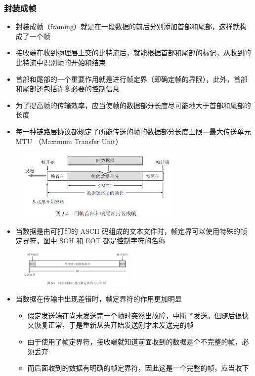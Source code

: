 \documentclass[cs4size,a4paper,10pt]{ctexart}
\begin{document}
	\subsubsection{封装成帧}
	\begin{itemize}
		\item 封装成帧（framing）就是在一段数据的前后分别添加首部和尾部，这样就构成了一个帧
		\item 接收端在收到物理层上交的比特流后，就能根据首部和尾部的标记，从收到的比特流中识别帧的开始和结束
		\item 首部和尾部的一个重要作用就是进行帧定界（即确定帧的界限），此外，首部和尾部还包括许多必要的控制信息
		\item 为了提高帧的传输效率，应当使帧的数据部分长度尽可能地大于首部和尾部的长度
		\item 每一种链路层协议都规定了所能传送的帧的数据部分长度上限—最大传送单元 MTU （Maximum Transfer Unit）
	\end{itemize}
	\begin{figure}[H]
		\centering
		\includegraphics[width=0.7\textwidth]{img/3.4}
	\end{figure}
	\begin{itemize}
		\item 当数据是由可打印的 ASCII 码组成的文本文件时，帧定界可以使用特殊的帧定界符，图中 SOH 和 EOT 都是控制字符的名称
	\end{itemize}
	\begin{figure}[H]
		\centering
		\includegraphics[width=0.5\textwidth]{img/3.5}
	\end{figure}
	\begin{itemize}
		\item 当数据在传输中出现差错时，帧定界符的作用更加明显
		\begin{itemize}
			\item 假定发送端在尚未发送完一个帧时突然出故障，中断了发送。但随后很快又恢复正常，于是重新从头开始发送刚才未发送完的帧
			\item 由于使用了帧定界符，接收端就知道前面收到的数据是个不完整的帧，必须丢弃
			\item 而后面收到的数据有明确的帧定界符，因此这是一个完整的帧，应当收下
		\end{itemize}
	\end{itemize}
\end{document}

